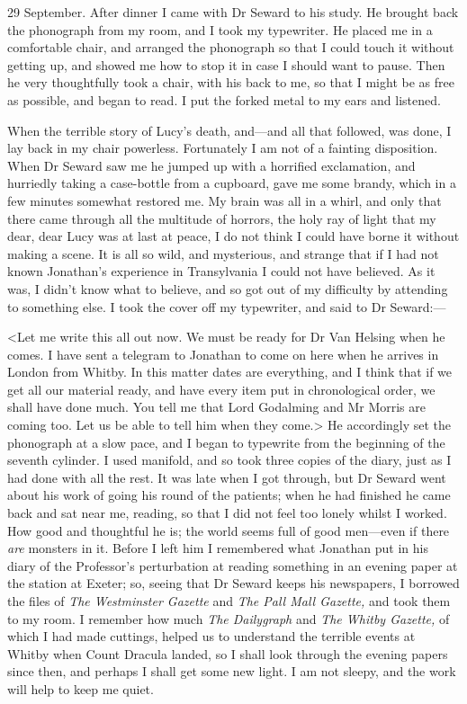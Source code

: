 \begin{diary}{29 September.}
After dinner I came with Dr Seward to his study. He brought back the phonograph from my room, and I took my typewriter. He placed me in a comfortable chair, and arranged the phonograph so that I could touch it without getting up, and showed me how to stop it in case I should want to pause. Then he very thoughtfully took a chair, with his back to me, so that I might be as free as possible, and began to read. I put the forked metal to my ears and listened.

When the terrible story of Lucy's death, and—and all that followed, was done, I lay back in my chair powerless. Fortunately I am not of a fainting disposition. When Dr Seward saw me he jumped up with a horrified exclamation, and hurriedly taking a case-bottle from a cupboard, gave me some brandy, which in a few minutes somewhat restored me. My brain was all in a whirl, and only that there came through all the multitude of horrors, the holy ray of light that my dear, dear Lucy was at last at peace, I do not think I could have borne it without making a scene. It is all so wild, and mysterious, and strange that if I had not known Jonathan's experience in Transylvania I could not have believed. As it was, I didn't know what to believe, and so got out of my difficulty by attending to something else. I took the cover off my typewriter, and said to Dr Seward:—

<Let me write this all out now. We must be ready for Dr Van Helsing when he comes. I have sent a telegram to Jonathan to come on here when he arrives in London from Whitby. In this matter dates are everything, and I think that if we get all our material ready, and have every item put in chronological order, we shall have done much. You tell me that Lord Godalming and Mr Morris are coming too. Let us be able to tell him when they come.> He accordingly set the phonograph at a slow pace, and I began to typewrite from the beginning of the seventh cylinder. I used manifold, and so took three copies of the diary, just as I had done with all the rest. It was late when I got through, but Dr Seward went about his work of going his round of the patients; when he had finished he came back and sat near me, reading, so that I did not feel too lonely whilst I worked. How good and thoughtful he is; the world seems full of good men—even if there \textit{are} monsters in it. Before I left him I remembered what Jonathan put in his diary of the Professor's perturbation at reading something in an evening paper at the station at Exeter; so, seeing that Dr Seward keeps his newspapers, I borrowed the files of \textit{The Westminster Gazette} and \textit{The Pall Mall Gazette,} and took them to my room. I remember how much \textit{The Dailygraph} and \textit{The Whitby Gazette,} of which I had made cuttings, helped us to understand the terrible events at Whitby when Count Dracula landed, so I shall look through the evening papers since then, and perhaps I shall get some new light. I am not sleepy, and the work will help to keep me quiet.
\end{diary}

